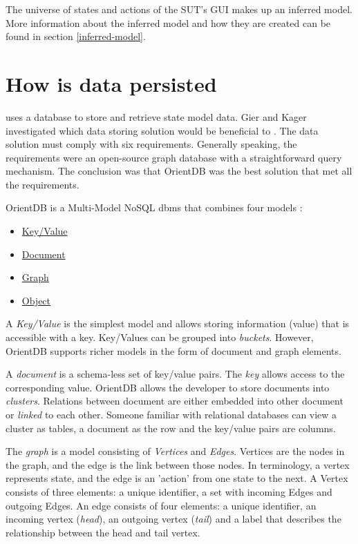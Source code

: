 The universe of states and actions of the SUT's GUI makes up an inferred model. More information about the inferred model and how they are created can be found in section \ref{inferred-model}.

\section{How is data persisted}

\testar uses a database to store and retrieve state model data. Gier and Kager investigated which data storing solution would be beneficial to \testar \cite{GierKager}. The data solution must comply with six requirements. Generally speaking, the requirements were an open-source graph database with a straightforward query mechanism. The conclusion was that OrientDB was the best solution that met all the requirements.

\begin{samepage}
OrientDB is a Multi-Model NoSQL \acrfull{dbms} that combines four models \cite{orientDbModeling}:

\begin{itemize}
    \item \hyperlink{db:key-value}{Key/Value}
    \item \hyperlink{db:document}{Document}
    \item \hyperlink{db:graph}{Graph}
    \item \hyperlink{db:object}{Object}
\end{itemize}
\end{samepage}

A \hypertarget{db:key-value}{\emph{Key/Value}} is the simplest model and allows storing information (value) that is accessible with a key. Key/Values can be grouped into \textit{buckets}. However, OrientDB supports richer models in the form of document and graph elements.

A \hypertarget{db:document}{\emph{document}} is a schema-less set of key/value pairs. The \emph{key} allows access to the corresponding value. OrientDB allows the developer to store documents into \emph{clusters}. Relations between document are either embedded into other document or \emph{linked} to each other. Someone familiar with relational databases can view a cluster as tables, a document as the row and the key/value pairs are columns.

The \hypertarget{db:graph}{\emph{graph}} is a model consisting of \emph{Vertices} and \emph{Edges}. Vertices are the nodes in the graph, and the edge is the link between those nodes. In \testar terminology, a vertex represents state, and the edge is an 'action' from one state to the next. A Vertex consists of three elements: a unique identifier, a set with incoming Edges and outgoing Edges. An edge consists of four elements: a unique identifier, an incoming vertex (\emph{head}), an outgoing vertex (\emph{tail}) and a label that describes the relationship between the head and tail vertex.\par

